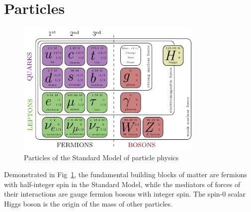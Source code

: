 \section{Particles}
\begin{figure}[htbp]
  \begin{center}
    \includegraphics[width=0.8\textwidth]{chapters/c1/figures/SM-particle-table}
  \end{center}
  \caption{Particles of the Standard Model of particle physics}
  \label{fig:c1Standard Modelparticletable}
\end{figure}
\par Demonstrated in Fig~\ref{fig:c1Standard Modelparticletable}, the fundamental building blocks of matter are fermions with half-integer spin in the Standard Model, while the mediators of forces of their interactions are gauge fermion bosons with integer spin. The spin-0 scalar Higgs boson is the origin of the mass of other particles.

